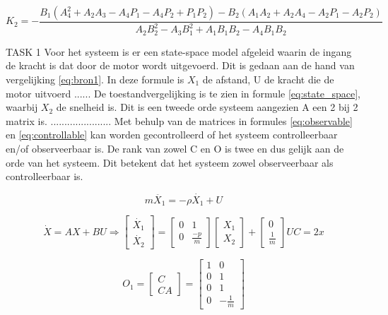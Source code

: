 \documentclass[11pt,titlepage]{report}
\begin{document}
\begin{equation} \label{eq:K2}
K_{2} = -\frac{B_{1}(A_{4}^2 + A_{2}A_{3} - A_{4}P_{1} - A_{4}P_{2} + P_{1}P_{2}) - B_{2}(A_{1}A_{2} + A_{2}A_{4} - A_{2}P_{1} - A_{2}P_{2})}{A_{2}B_{2}^2 - A_{3}B_{1}^2 + A_{1}B_{1}B_{2} - A_{4}B_{1}B_{2}}
\end{equation}



TASK 1
Voor het systeem is er een state-space model afgeleid waarin de ingang de kracht is dat door de motor wordt uitgevoerd. Dit is gedaan aan de hand van vergelijking \eqref{eq:bron1}. In deze formule is $X_{1}$ de afstand, U de kracht die de motor uitvoerd ......  De toestandvergelijking is te zien in formule \eqref{eq:state_space}, waarbij $X_{2}$ de snelheid is. Dit is een tweede orde systeem aangezien A een 2 bij 2 matrix is. ...................... Met behulp van de matrices in formules \eqref{eq:observable} en \eqref{eq:controllable} kan worden gecontrolleerd of het systeem controlleerbaar en/of observeerbaar is. De rank van zowel C en O is twee en dus gelijk aan de orde van het systeem. Dit betekent dat het systeem zowel observeerbaar als controlleerbaar is. 

\begin{equation} \label{eq:bron1} 
m\ddot{X_{1}} = -{\rho}\dot{X_{1}} + U
\end{equation}

\begin{equation} \label{eq:state_space}
	\dot{X} = AX + BU   \Longrightarrow
    \begin{bmatrix}
    \dot{X_{1}} \\ 
    \dot{X_{2}} 
    \end{bmatrix} = \begin{bmatrix}
        0 & 1 \\
        0 & \frac{-p}{m}
     \end{bmatrix}
    \begin{bmatrix}
        X_{1} \\
        X_{2}
    \end{bmatrix} + \begin{bmatrix}
    0 \\
    \frac{1}{m}
    \end{bmatrix}U 
    C = 2x
\end{equation}

\begin{equation} \label{eq:observable}
	O_{1} = \begin{bmatrix}
	  C \\
	  CA
	\end{bmatrix} = \begin{bmatrix}
	1 & 0 \\ 
	0 & 1 \\
	0 & 1 \\
	0 & -\frac{1}{m}
	\end{bmatrix}
\end{equation}
\end{document}
